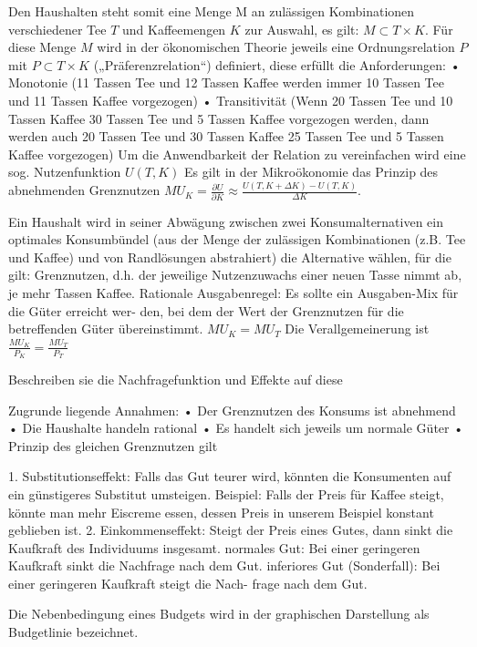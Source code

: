Den Haushalten steht somit eine Menge M an zulässigen Kombinationen verschiedener Tee \( T \) und Kaffeemengen \( K \) zur Auswahl, es gilt: 
\( M \subset T \times K \).
Für diese Menge \( M \) wird in der ökonomischen Theorie jeweils eine Ordnungsrelation \( P \) mit \( P \subset T \times K \) 
(„Präferenzrelation“) definiert, diese erfüllt die
Anforderungen:
• Monotonie (11 Tassen Tee und 12 Tassen Kaffee werden immer 10 Tassen Tee und 11 Tassen Kaffee vorgezogen)
• Transitivität (Wenn 20 Tassen Tee und 10 Tassen Kaffee 30 Tassen Tee und 5 Tassen Kaffee vorgezogen werden, dann werden auch 20 Tassen
Tee und 30 Tassen Kaffee 25 Tassen Tee und 5 Tassen Kaffee vorgezogen)
Um die Anwendbarkeit der Relation zu vereinfachen wird eine sog. Nutzenfunktion \( U(T, K) \)
Es gilt in der Mikroökonomie das Prinzip des abnehmenden Grenznutzen \( MU_K = \frac{\partial U}{\partial K} \approx \frac{U(T, K + \Delta K) - U(T, K)}{\Delta K} \).

Ein Haushalt wird in seiner Abwägung zwischen zwei
Konsumalternativen ein optimales Konsumbündel (aus der Menge der
zulässigen Kombinationen (z.B. Tee und Kaffee) und von Randlösungen
abstrahiert) die Alternative wählen, für die gilt:
Grenznutzen, d.h. der jeweilige Nutzenzuwachs einer neuen Tasse
nimmt ab, je mehr Tassen Kaffee.
Rationale Ausgabenregel: Es sollte ein Ausgaben-Mix für die Güter erreicht wer-
den, bei dem der Wert der Grenznutzen für die betreffenden Güter übereinstimmt.
\( MU_K = M U_T \)
Die Verallgemeinerung ist
\( \frac{MU_K}{P_K} = \frac{MU_T}{P_T} \)



Beschreiben sie die Nachfragefunktion und Effekte auf diese

Zugrunde liegende Annahmen:
• Der Grenznutzen des Konsums ist abnehmend
• Die Haushalte handeln rational
• Es handelt sich jeweils um normale Güter
• Prinzip des gleichen Grenznutzen gilt

1. Substitutionseffekt: Falls das Gut teurer wird, könnten die Konsumenten
auf ein günstigeres Substitut umsteigen.
Beispiel: Falls der Preis für Kaffee steigt, könnte man mehr Eiscreme essen,
dessen Preis in unserem Beispiel konstant geblieben ist.
2. Einkommenseffekt: Steigt der Preis eines Gutes, dann sinkt die Kaufkraft
des Individuums insgesamt.
normales Gut: Bei einer geringeren Kaufkraft sinkt die Nachfrage nach dem
Gut.
inferiores Gut (Sonderfall): Bei einer geringeren Kaufkraft steigt die Nach-
frage nach dem Gut.

Die Nebenbedingung eines Budgets wird in der graphischen Darstellung
als Budgetlinie bezeichnet.


